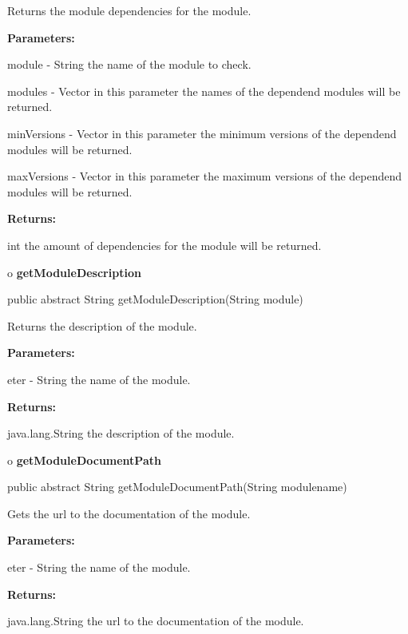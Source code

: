 \begin{description}
\htmlDD Returns the module dependencies for the module. 

\begin{description}
\item {\bf Parameters:}  

module - String the name of the module to check.  

modules - Vector in this parameter the names of the dependend modules will be
returned.  

minVersions - Vector in this parameter the minimum versions of the dependend
modules will be returned.  

maxVersions - Vector in this parameter the maximum versions of the dependend
modules will be returned.  
\item {\bf Returns:}  

int the amount of dependencies for the module will be returned.  
\end{description}

\end{description}

o {\bf getModuleDescription} 

\begin{PRE}
 public abstract String getModuleDescription(String module)
\end{PRE}

\begin{description}
\htmlDD Returns the description of the module. 

\begin{description}
\item {\bf Parameters:}  

eter - String the name of the module.  
\item {\bf Returns:}  

java.lang.String the description of the module.  
\end{description}

\end{description}

o {\bf getModuleDocumentPath} 

\begin{PRE}
 public abstract String getModuleDocumentPath(String modulename)
\end{PRE}

\begin{description}
\htmlDD Gets the url to the documentation of the module. 

\begin{description}
\item {\bf Parameters:}  

eter - String the name of the module.  
\item {\bf Returns:}  

java.lang.String the url to the documentation of the module.  
\end{description}

\end{description}


